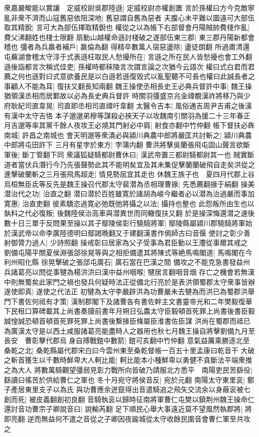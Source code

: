 衆嘉嚴畯能以實讓　定威校尉吳郡陸遜|{
	定威校尉亦權創置}
言於孫權曰方今克敵寧亂非衆不濟而山寇舊惡依阻深地|{
	舊惡謂自舊為惡者}
夫腹心未平難以圖遠可大部伍取其精銳|{
	言可大為部伍擇取精銳也}
權從之以為帳下右部督會丹陽賊帥費棧作亂|{
	費父沸翻姓也棧士限翻}
扇動山越權命遜討棧破之遂部伍東三郡|{
	東三郡丹陽新都會稽也}
彊者為兵羸者補戶|{
	羸倫為翻}
得精卒數萬人宿惡盪除|{
	盪徒朗翻}
所過肅清還屯蕪湖會稽太守淳于式表遜枉取民人愁擾所在|{
	言遜之所在民人皆愁擾也會工外翻}
遜後詣都言次稱式佳吏|{
	孫權時都秣陵言次謂言論之次猶今云語次}
權曰式白君而君薦之何也遜對曰式意欲養民是以白遜若遜復毁式以亂聖聽不可長也權曰此誠長者之事顧人不能為耳|{
	復扶又翻長知兩翻}
魏王操使丞相長史王必典兵督許中事|{
	魏王操猶領漢丞相而居鄴故以必為長史典兵督許}
時關羽彊盛京兆金禕覩漢祚將移乃與少府耿紀司直韋晃|{
	司直即丞相司直禕吁韋翻}
太醫令吉本|{
	風俗通吉周尹吉甫之後漢有漢中太守吉恪}
本子邈邈弟穆等謀殺必挾天子以攻魏南引關羽為援二十三年春正月吉邈等率其黨千餘人夜攻王必燒其門射必中肩|{
	射食亦翻中竹仲翻}
帳下督扶必犇南城|{
	許昌之南城也}
會天明邈等衆潰必與潁川典農中郎將嚴匡共討斬之|{
	潁川典農中郎將屯田許下}
三月有星孛於東方|{
	孛蒲内翻}
曹洪將擊吳蘭張飛屯固山聲言欲斷軍後|{
	斷丁管翻下同}
衆議狐疑騎都尉曹休曰|{
	漢武帝置三都尉騎都尉其一也}
賊實斷道者當伏兵潛行今乃先張聲勢此其不能明矣宜及其未集促擊蘭蘭破飛自走矣洪從之進擊破蘭斬之三月張飛馬超走|{
	情見勢屈宜其走也}
休魏王族子也　夏四月代郡上谷烏桓無臣氐等反先是魏王操召代郡太守裴潜為丞相理曹掾|{
	先悉薦翻掾于絹翻}
操美潜治代之功|{
	治直之翻}
潜曰潜於百姓雖寛於諸胡為峻今繼者必以潜為治過嚴而事加寛惠|{
	治直吏翻}
彼素驕恣過寛必弛既弛將攝之以法|{
	攝持也整也}
此怨叛所由生也以埶料之代必復叛|{
	後魏陸侯治高車與潜異世而同轍復扶又翻}
於是操深悔還潜之速後數十日三單于反問果至操以其子鄢陵侯彰行驍騎將軍|{
	鄢陵縣屬潁川郡驍騎將軍始於漢武帝以命李廣陸德明曰鄢謁晩翻又于建翻漢書作傿師古曰音偃}
使討之彰少善射御膂力過人|{
	少詩照翻}
操戒彰曰居家為父子受事為君臣動以王灋從事爾其戒之　劉備屯陽平關夏侯淵張郃徐晃等與之相拒備遣其將陳式等絶馬鳴閣道|{
	馬鳴閣在今利州昭化縣}
徐晃擊破之張郃屯廣石|{
	廣石當在巴漢之間}
備攻之不能克急書發益州兵諸葛亮以問從事犍為楊洪洪曰漢中益州咽喉|{
	犍居言翻咽音烟}
存亡之機會若無漢中則無蜀矣此家門之禍也發兵何疑時法正從備北行亮於是表洪領蜀郡太守衆事皆辦遂使即真|{
	遂使之代法正}
初犍為太守李嚴辟洪為功曹嚴未去犍為而洪已為蜀郡洪舉門下書佐何祗有才策|{
	漢制郡閣下及諸曹各有書佐幹主文書靈帝光和二年樊毅復華下民租口算碑載其上尚書奏牘前書年月朔日弘農太守臣毅頓首死罪上尚書後書臣毅誠惶誠恐頓首頓首死罪死罪上尚書後繫掾臣條屬臣淮書佐臣謀}
洪尚在蜀郡而祗已為廣漢太守是以西土咸服諸葛亮能盡時人之器用也秋七月魏王操自將擊劉備九月至長安　曹彰擊代郡烏身自搏戰鎧中數箭|{
	鎧可亥翻中竹仲翻}
意氣益厲乘勝逐北至桑乾之北|{
	桑乾縣屬代郡宋白曰今雲州東至桑乾督帳一百五十里孟康曰乾音干}
大破之斬首獲生以千數時鮮卑大人軻比能|{
	軻比能本小種鮮卑以勇健不貪斷法平端衆推之為大人}
將數萬騎觀望彊弱見彰力戰所向皆破乃請服北方悉平　南陽吏民苦繇役|{
	繇讀曰徭苦於供給曹仁之軍也}
冬十月宛守將侯音反|{
	宛於元翻}
南陽太守東里衮|{
	鄭子產居東里支子以為氏}
與功曹應余迸竄得出音遣騎追之飛矢交流余以身蔽衮被七創而死|{
	被皮義翻創初良翻}
音騎執衮以歸時征南將軍曹仁屯樊以鎮荆州魏王操命仁還討音功曹宗子卿說音曰|{
	說輸芮翻}
足下順民心舉大事遠近莫不望風然執郡將|{
	將即亮翻}
逆而無益何不遣之音從之子卿因夜踰城從太守收餘民圍音會曹仁軍至共攻之

